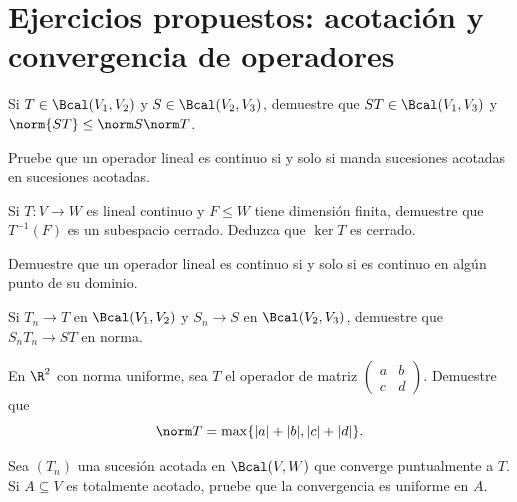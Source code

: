 \section{Ejercicios propuestos: acotación y convergencia de operadores}

\begin{ejercicio}\label{ej:lectura-20-1}
Si $T\in\Bcal(V_1,V_2)$ y $S\in\Bcal(V_2,V_3)$, demuestre que $ST\in\Bcal(V_1,V_3)$ y $\norm{ST}\leq\norm S\norm T$.
\end{ejercicio}


\begin{ejercicio}\label{ej:lectura-20-2}
Pruebe que un operador lineal es continuo si y solo si manda sucesiones acotadas en sucesiones acotadas.
\end{ejercicio}


\begin{ejercicio}\label{ej:lectura-20-3}
Si $T:V\to W$ es lineal continuo y $F\leq W$ tiene dimensión finita, demuestre que $T^{-1}(F)$ es un subespacio cerrado. Deduzca que $\ker T$ es cerrado.
\end{ejercicio}


\begin{ejercicio}\label{ej:lectura-20-4}
Demuestre que un operador lineal es continuo si y solo si es continuo en algún punto de su dominio.
\end{ejercicio}


\begin{ejercicio}\label{ej:lectura-20-5}
Si $T_n\to T$ en $\Bcal(V_1,V_2)$ y $S_n\to S$ en $\Bcal(V_2,V_3)$, demuestre que $S_nT_n\to ST$ en norma.
\end{ejercicio}


\begin{ejercicio}\label{ej:lectura-20-6}
En $\R^2$ con norma uniforme, sea $T$ el operador de matriz $\begin{pmatrix}a&b\\c&d\end{pmatrix}$. Demuestre que
\[\norm T=\max\{|a|+|b|,|c|+|d|\}.\]
\end{ejercicio}


\begin{ejercicio}\label{ej:lectura-20-7}
Sea $(T_n)$ una sucesión acotada en $\Bcal(V,W)$ que converge puntualmente a $T$. Si $A\subseteq V$ es totalmente acotado, pruebe que la convergencia es uniforme en $A$.
\end{ejercicio}


